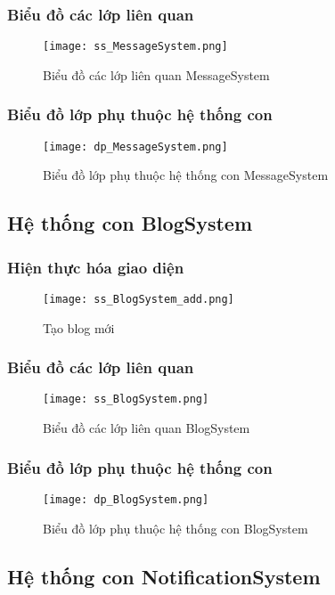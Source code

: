 \documentclass[./../main.tex]{subfiles}
\begin{document}
\subsubsection{Biểu đồ các lớp liên quan}
\begin{figure}[H]
    \centering
    \texttt{[image: ss\_MessageSystem.png]}
    \caption{Biểu đồ các lớp liên quan MessageSystem}
    \label{ss_ms}
\end{figure}
\subsubsection{Biểu đồ lớp phụ thuộc hệ thống con}
\begin{figure}[H]
    \centering
    \texttt{[image: dp\_MessageSystem.png]}
    \caption{Biểu đồ lớp phụ thuộc hệ thống con MessageSystem}
    \label{<label>}
\end{figure}

\subsection{Hệ thống con BlogSystem}
\subsubsection{Hiện thực hóa giao diện}
\begin{figure}[H]
    \centering
    \texttt{[image: ss\_BlogSystem\_add.png]}
    \caption{Tạo blog mới}
    \label{ss_bs_a}
\end{figure}
\subsubsection{Biểu đồ các lớp liên quan}
\begin{figure}[H]
    \centering
    \texttt{[image: ss\_BlogSystem.png]}
    \caption{Biểu đồ các lớp liên quan BlogSystem}
    \label{ss_bs}
\end{figure}
\subsubsection{Biểu đồ lớp phụ thuộc hệ thống con}
\begin{figure}[H]
    \centering
    \texttt{[image: dp\_BlogSystem.png]}
    \caption{Biểu đồ lớp phụ thuộc hệ thống con BlogSystem}
    \label{dp_bs}
\end{figure}

\subsection{Hệ thống con NotificationSystem}
\end{document}
